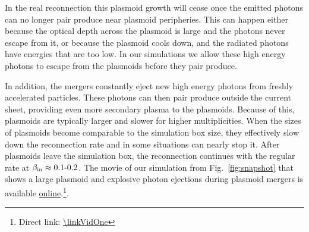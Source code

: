 In the real reconnection this plasmoid growth will cease once the emitted photons can no longer pair produce near plasmoid peripheries. This can happen either because the optical depth across the plasmoid is large and the photons never escape from it, or because the plasmoid cools down, and the radiated photons have energies that are too low. In our simulations we allow these high energy photons to escape from the plasmoids before they pair produce.

In addition, the mergers constantly eject new high energy photons from freshly accelerated particles. These photons can then pair produce outside the current sheet, providing even more secondary plasma to the plasmoids. Because of this, plasmoids are typically larger and slower for higher multiplicities. When the sizes of plasmoids become comparable to the simulation box size, they effectively slow down the reconnection rate and in some situations can nearly stop it. After plasmoids leave the simulation box, the reconnection continues with the regular rate at $\beta_{\rm in}\approx 0.1\text{-}0.2$. The movie of our simulation from Fig.~\ref{fig:snapshot} that shows a large plasmoid and explosive photon ejections during plasmoid mergers is available \href{\linkVidOne}{online}.\footnote{Direct link: \url{\linkVidOne}}.


